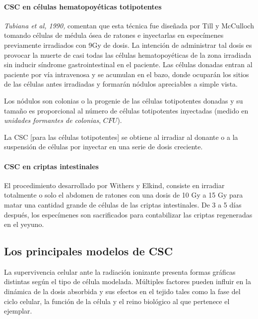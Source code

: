 \documentclass[12pt,letterpaper, oneside]{book}
\begin{document}
				\paragraph{CSC en células hematopoyéticas totipotentes \newline}
				\textit{Tubiana et al, 1990,} comentan que esta técnica fue diseñada por Till y McCulloch tomando células de médula ósea de ratones e inyectarlas en especímenes previamente irradiados con 9Gy de dosis. La intención de administrar tal dosis es provocar la muerte de casi todas las células hematopoyéticas de la zona irradiada sin inducir síndrome gastrointestinal en el paciente. Las células donadas entran al paciente por vía intravenosa y se acumulan en el bazo, donde ocuparán los sitios de las células antes irradiadas y formarán nódulos apreciables a simple vista. 
				
				Los nódulos son colonias o la progenie de las células totipotentes donadas y su tamaño es proporcional al número de células totipotentes inyectadas (medido en \textit{unidades formantes de colonias}, $CFU$). 
				
				La CSC [para las células totipotentes] se obtiene al irradiar al donante o a la suspensión de células por inyectar en una serie de dosis creciente. 
				
				\paragraph{CSC en criptas intestinales \newline}
				El procedimiento desarrollado por Withers y Elkind, consiste en irradiar totalmente o solo el abdomen de ratones con una dosis de 10 Gy a 15 Gy para matar una cantidad grande de células de las criptas intestinales. De 3 a 5 días después, los especímenes son sacrificados para contabilizar las criptas regeneradas en el yeyuno\cite{Tubiana.1990}. 
			
			\subsection{Los principales modelos de CSC}
			La supervivencia celular ante la radiación ionizante presenta formas gráficas distintas según el tipo de célula modelada\cite{Tubiana.1990}. Múltiples factores pueden influir en la dinámica de la dosis absorbida y sus efectos en el tejido tales como la fase del ciclo celular, la función de la célula y el reino biológico al que pertenece el ejemplar\cite{Tubiana.1990}.
			
\end{document}
